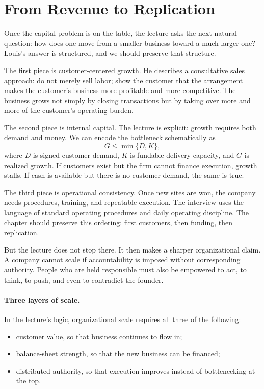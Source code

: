 \section{From Revenue to Replication}

Once the capital problem is on the table, the lecture asks the next natural question: how does one move from a smaller business toward a much larger one? Louis's answer is structured, and we should preserve that structure.

The first piece is customer-centered growth. He describes a consultative sales approach: do not merely sell labor; show the customer that the arrangement makes the customer's business more profitable and more competitive. The business grows not simply by closing transactions but by taking over more and more of the customer's operating burden.

The second piece is internal capital. The lecture is explicit: growth requires both demand and money. We can encode the bottleneck schematically as
\begin{equation}
G \le \min\{D,K\},
\end{equation}
where \(D\) is signed customer demand, \(K\) is fundable delivery capacity, and \(G\) is realized growth. If customers exist but the firm cannot finance execution, growth stalls. If cash is available but there is no customer demand, the same is true.

The third piece is operational consistency. Once new sites are won, the company needs procedures, training, and repeatable execution. The interview uses the language of standard operating procedures and daily operating discipline. The chapter should preserve this ordering: first customers, then funding, then replication.

But the lecture does not stop there. It then makes a sharper organizational claim. A company cannot scale if accountability is imposed without corresponding authority. People who are held responsible must also be empowered to act, to think, to push, and even to contradict the founder.

\paragraph{Three layers of scale.}
In the lecture's logic, organizational scale requires all three of the following:
\begin{itemize}
\item customer value, so that business continues to flow in;
\item balance-sheet strength, so that the new business can be financed;
\item distributed authority, so that execution improves instead of bottlenecking at the top.
\end{itemize}


